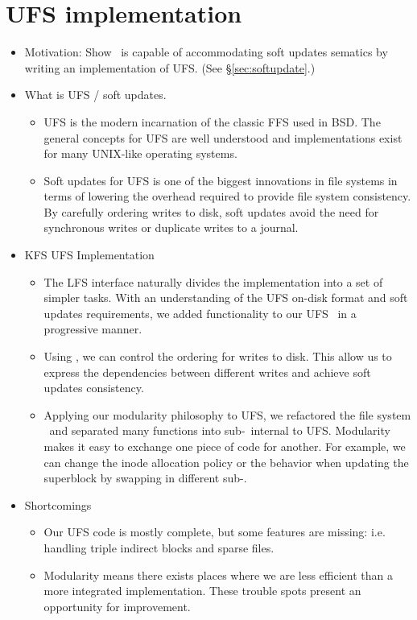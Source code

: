 \section{UFS implementation}
\label{sec:ufs}

\begin{itemize}
\item Motivation: Show \Kudos\ is capable of accommodating soft updates
  sematics by writing an implementation of UFS. (See \S\ref{sec:softupdate}.)
\item What is UFS / soft updates.
  \begin{itemize}
  \item UFS is the modern incarnation of the classic FFS used in BSD.
    The general concepts for UFS are well understood and implementations
    exist for many UNIX-like operating systems.
  \item Soft updates for UFS is one of the biggest innovations in file
    systems in terms of lowering the overhead required to provide file
    system consistency. By carefully ordering writes to disk, soft updates
    avoid the need for synchronous writes or duplicate writes to a journal.
  \end{itemize}
\item KFS UFS Implementation
  \begin{itemize}
  \item The LFS interface naturally divides the implementation into a set
    of simpler tasks. With an understanding of the UFS on-disk format and
    soft updates requirements, we added functionality to our UFS \module\
    in a progressive manner.
  \item Using \chdescs, we can control the ordering for writes
    to disk. This allow us to express the dependencies between different
    writes and achieve soft updates consistency.
  \item Applying our modularity philosophy to UFS, we refactored the file
    system \module\ and separated many functions into sub-\modules\ internal
    to UFS. Modularity makes it easy to exchange one piece of code for
    another. For example, we can change the inode allocation policy or
    the behavior when updating the superblock by swapping in different
    sub-\module.
  \end{itemize}
\item Shortcomings
  \begin{itemize}
  \item Our UFS code is mostly complete, but some features are missing:
    i.e. handling triple indirect blocks and sparse files.
  \item Modularity means there exists places where we are less efficient
    than a more integrated implementation. These trouble spots present
    an opportunity for improvement.
  \end{itemize}
\end{itemize}
